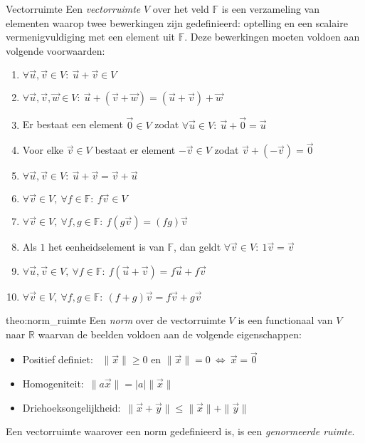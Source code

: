 \vspace{0.5cm}

\begin{theo}[Vectorruimte]{Vectorruimte}
    Een \emph{vectorruimte} $V$ over het veld $\mathbb{F}$ is een verzameling van elementen waarop twee bewerkingen zijn gedefinieerd: optelling en een scalaire vermenigvuldiging met een element uit $\mathbb{F}$. Deze bewerkingen moeten voldoen aan volgende voorwaarden:
    \begin{enumerate}
        \item $\forall \vec{u},\vec{v} \in V: \ \vec{u} + \vec{v} \in V$
        \item $\forall \vec{u},\vec{v},\vec{w} \in V: \ \vec{u} + (\vec{v} + \vec{w}) = (\vec{u} + \vec{v}) + \vec{w}$
        \item Er bestaat een element $\vec{0} \in V$ zodat $\forall \vec{u} \in V: \ \vec{u} + \vec{0} = \vec{u}$
        \item Voor elke $\vec{v} \in V$ bestaat er element $-\vec{v} \in V$ zodat $\vec{v} + (-\vec{v}) = \vec{0}$
        \item $\forall \vec{u},\vec{v} \in V: \ \vec{u} + \vec{v} = \vec{v} + \vec{u}$
        \item $\forall \vec{v} \in V,\ \forall f \in \mathbb{F}: \ f \vec{v} \in V$
        \item $\forall \vec{v} \in V,\ \forall f,g \in \mathbb{F}: \ f(g\vec{v}) = (fg)\vec{v}$
        \item Als $1$ het eenheidselement is van $\mathbb{F}$, dan geldt $\forall \vec{v} \in V: \ 1\vec{v} = \vec{v}$
        \item $\forall \vec{u},\vec{v} \in V,\ \forall f \in \mathbb{F}: \ f(\vec{u} + \vec{v}) = f\vec{u} + f\vec{v}$
        \item $\forall \vec{v} \in V,\ \forall f,g \in \mathbb{F}: \ (f+g)\vec{v} = f\vec{v} + g\vec{v}$
    \end{enumerate}
\end{theo}

\begin{theo}{theo:norm_ruimte}
    Een \emph{norm} over de vectorruimte $V$ is een functionaal van $V$ naar $\mathbb{R}$ waarvan de beelden voldoen aan de volgende eigenschappen:
    \begin{itemize}
        \item Positief definiet: \ $\|\vec{x}\| \geq 0$ en $\|\vec{x}\| = 0 \ \Leftrightarrow \ \vec{x} = \vec{0}$
        \item Homogeniteit:\ $\|a\vec{x}\| = |a|\|\vec{x}\|$
        \item Driehoeksongelijkheid:\ $\|\vec{x} + \vec{y}\| \leq \|\vec{x}\| + \|\vec{y}\|$
    \end{itemize}
    Een vectorruimte waarover een norm gedefinieerd is, is een \emph{genormeerde ruimte}.
\end{theo}

